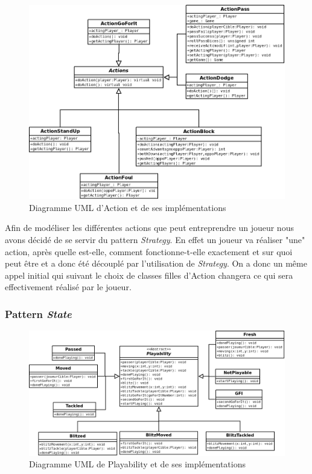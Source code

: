 \documentclass{article}
\newcommand{\pattern}{\emph}
\begin{document}
            \begin{figure}[H]
                \centerline{\includegraphics[scale=0.5]{img/Actions.png}}
                \caption{\label{DiaActions} Diagramme UML d'Action et de ses implémentations}
            \end{figure}
        
            Afin de modéliser les différentes actions que peut entreprendre un joueur nous avons décidé de se servir du pattern \pattern{Strategy}. En effet un joueur va réaliser "une" action, après quelle est-elle, comment fonctionne-t-elle exactement et sur quoi peut être et a donc été découplé par  l'utilisation de \pattern{Strategy}. On a donc un même appel initial qui suivant le choix de classes filles d'Action changera ce qui sera effectivement réalisé par le joueur.
        
        \subsubsection{Pattern \pattern{State}}
        
            \begin{figure}[H]
                \centerline{\includegraphics[scale=0.5]{img/PlayabilityState.png}}
                \caption{\label{DiaPlayability} Diagramme UML de Playability et de ses implémentations}
            \end{figure}
            
\end{document}
